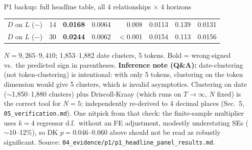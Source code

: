\documentclass[aspectratio=169]{beamer}
\begin{document}
\begin{frame}{P1 backup: full headline table, all 4 relationships $\times$ 4 horizons}
\begin{center}
\begin{tabular}{@{}l c r r r r r r@{}}
    $D$ on $L$ ($-$) & 14 & \textbf{0.0168} & 0.0064 & 0.008 & 0.0113 & 0.139 & 0.0131 \\
    $D$ on $L$ ($-$) & 30 & \textbf{0.0244} & 0.0062 & $<$0.001 & 0.0154 & 0.113 & 0.0156 \\
    \bottomrule
  \end{tabular}
  \end{center}
  \vspace{0.3em}
  \tiny $N=9{,}265$--$9{,}410$; 1{,}853--1{,}882 date clusters, 5 tokens. Bold = wrong-signed vs.\ the predicted sign in parentheses. \textbf{Inference note (Q\&A):} date-clustering (not token-clustering) is intentional: with only 5 tokens, clustering on the token dimension would give 5 clusters, which is invalid asymptotics. Clustering on date ($\sim$1{,}850--1{,}880 clusters) plus Driscoll-Kraay (which runs on $T\to\infty$, $N$ fixed) is the correct tool for $N=5$; independently re-derived to 4 decimal places (Sec.\ 5, \texttt{05\_verification.md}). One nitpick from that check: the finite-sample multiplier uses $k=4$ regressor d.f.\ without an FE adjustment, modestly understating SEs ($\sim$10--12\%), so DK $p=0.046$--$0.060$ above should not be read as robustly significant. Source: \texttt{04\_evidence/p1/p1\_headline\_panel\_results.md}.
\end{frame}
\end{document}

